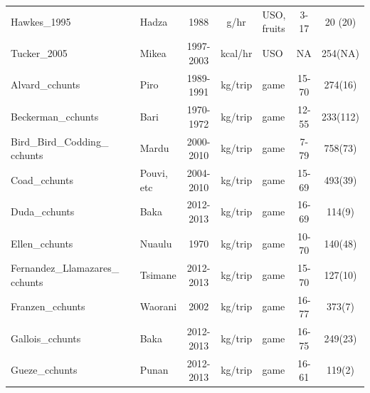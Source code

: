 \begin{landscape}
\begin{longtable}{M{2.6cm} M{3.6cm} M{1.5cm} c c M{1cm} c c}
Hawkes\_1995                   & \cite{hawkes_hadza_1995}                  & Hadza           & 1988       & g/hr      & USO, fruits        & 3-17    & 20 (20)     \\
Tucker\_2005                   & \cite{tucker_growing_2005}                & Mikea           & 1997- 2003 & kcal/hr   & USO                & NA      & 254(NA)     \\
Alvard\_cchunts                & \cite{alvard_shotguns_1995}               & Piro            & 1989-1991  & kg/trip   & game               & 15-70   & 274(16)     \\
Beckerman\_cchunts             & \cite{beckerman_ecology_2013}             & Bari            & 1970-1972  & kg/trip   & game               & 12-55   & 233(112)    \\
Bird\_Bird\_Codding\_ cchunts     & \cite{bird_pursuit_2009}                  & Mardu           & 2000-2010  & kg/trip   & game               & 7-79    & 758(73)     \\
Coad\_cchunts                  & \cite{coad_bushmeat_2008}                 & Pouvi, etc    & 2004-2010  & kg/trip   & game               & 15- 69  & 493(39)     \\
Duda\_cchunts                  & \cite{reyes-garcia_adaptive_2016}         & Baka            & 2012-2013  & kg/trip   & game               & 16- 69  & 114(9)      \\
Ellen\_cchunts                 & \cite{ellen_individual_1996}              & Nuaulu          & 1970       & kg/trip   & game               & 10-70   & 140(48)     \\
Fernandez\_Llamazares\_ cchunts  & \cite{reyes-garcia_adaptive_2016}         & Tsimane         & 2012-2013  & kg/trip   & game               & 15-70   & 127(10)     \\
Franzen\_cchunts               & \cite{franzen_evaluating_2006}            & Waorani         & 2002       & kg/trip   & game               & 16- 77  & 373(7)      \\
Gallois\_cchunts               & \cite{reyes-garcia_adaptive_2016}         & Baka            & 2012-2013  & kg/trip   & game               & 16- 75  & 249(23)     \\
Gueze\_cchunts                 & \cite{reyes-garcia_adaptive_2016}         & Punan           & 2012-2013  & kg/trip   & game               & 16- 61  & 119(2)      \\

\end{longtable}
\end{landscape}
